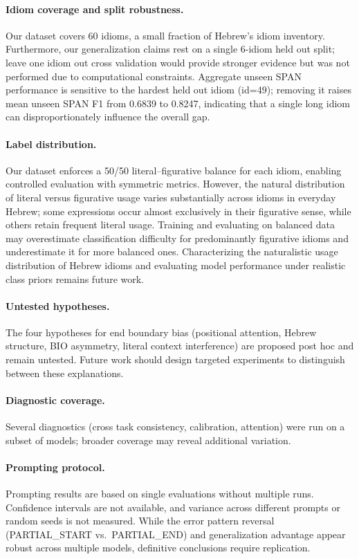 \documentclass[11pt, a4paper]{report}
\begin{document}
\paragraph{Idiom coverage and split robustness.}
Our dataset covers 60 idioms, a small fraction of Hebrew's idiom inventory. Furthermore, our generalization claims rest on a single 6-idiom held out split; leave one idiom out cross validation would provide stronger evidence but was not performed due to computational constraints. Aggregate unseen SPAN performance is sensitive to the hardest held out idiom (id=49); removing it raises mean unseen SPAN F1 from 0.6839 to 0.8247, indicating that a single long idiom can disproportionately influence the overall gap.

\paragraph{Label distribution.}
Our dataset enforces a 50/50 literal--figurative balance for each idiom, enabling controlled evaluation with symmetric metrics. However, the natural distribution of literal versus figurative usage varies substantially across idioms in everyday Hebrew; some expressions occur almost exclusively in their figurative sense, while others retain frequent literal usage. Training and evaluating on balanced data may overestimate classification difficulty for predominantly figurative idioms and underestimate it for more balanced ones. Characterizing the naturalistic usage distribution of Hebrew idioms and evaluating model performance under realistic class priors remains future work.

\paragraph{Untested hypotheses.}
The four hypotheses for end boundary bias (positional attention, Hebrew structure, BIO asymmetry, literal context interference) are proposed post hoc and remain untested. Future work should design targeted experiments to distinguish between these explanations.

\paragraph{Diagnostic coverage.}
Several diagnostics (cross task consistency, calibration, attention) were run on a subset of models; broader coverage may reveal additional variation.

\paragraph{Prompting protocol.}
Prompting results are based on single evaluations without multiple runs. Confidence intervals are not available, and variance across different prompts or random seeds is not measured. While the error pattern reversal (PARTIAL\_START vs.\ PARTIAL\_END) and generalization advantage appear robust across multiple models, definitive conclusions require replication.
\end{document}

